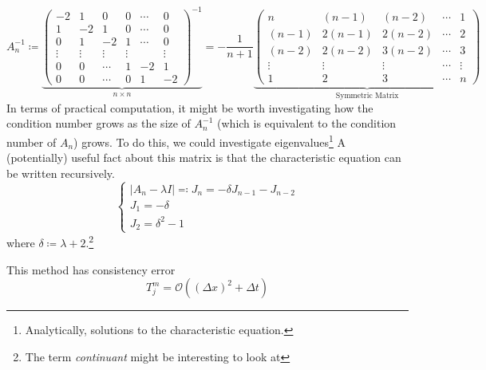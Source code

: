 \documentclass[a4paper]{article}
\theoremstyle{definition}
\begin{document}
\begin{equation}
    A_n^{-1} \coloneqq
    \underbrace{
    \begin{pmatrix}
        -2 & 1 & 0 & 0 & \cdots & 0 \\
        1 & -2 & 1 & 0 & \cdots & 0 \\
        0 & 1 & -2 & 1 & \cdots & 0 \\
        \vdots & \vdots & \vdots & \vdots & & \vdots \\
        0 & 0 & \cdots & 1 & -2 & 1 \\
        0 & 0 & \cdots & 0 & 1 & -2
    \end{pmatrix}^{-1}
}_{n \times n}
= -\frac{1}{n+1}
\underbrace{
\begin{pmatrix}
    n & (n-1) & (n-2) & \cdots & 1 \\
    (n-1) & 2(n-1) & 2(n-2) & \cdots & 2 \\
    (n-2) & 2(n-2) & 3(n-2) & \cdots & 3 \\
    \vdots & \vdots & \vdots & \cdots & \vdots \\
    1 & 2 & 3 & \cdots & n
\end{pmatrix}
}_{\text{Symmetric Matrix}}
\end{equation}
In terms of practical computation, it might be worth investigating how the condition number grows as the size of $A_n^{-1}$ (which is equivalent to the condition number of $A_n$) grows.
To do this, we could investigate eigenvalues\footnote{Analytically, solutions to the characteristic equation.}
A (potentially) useful fact about this matrix is that the characteristic equation can be written recursively.
\begin{equation}
    \begin{cases}
        |A_n - \lambda I|\eqqcolon J_n = -\delta J_{n-1} - J_{n-2} \\
        J_1 = -\delta \\
        J_{2} = \delta^2 - 1
    \end{cases}
\end{equation}
where $\delta \coloneqq \lambda + 2$.\footnote{The term \emph{continuant} might be interesting to look at}

This method has consistency error
\begin{equation}
    T_j^m = \mathcal{O}\left( \left( \Delta x \right)^2 + \Delta t \right)
    \label{H2 Consistency Error}
\end{equation}
\end{document}
